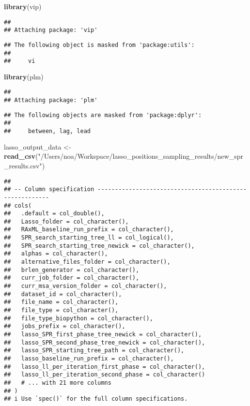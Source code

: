 \documentclass[
]{article}
\newenvironment{Shaded}{\begin{snugshade}}{\end{snugshade}}
\newcommand{\KeywordTok}[1]{\textcolor[rgb]{0.13,0.29,0.53}{\textbf{#1}}}
\newcommand{\NormalTok}[1]{#1}
\newcommand{\StringTok}[1]{\textcolor[rgb]{0.31,0.60,0.02}{#1}}
\begin{document}
\begin{Shaded}
\begin{Highlighting}[]
\KeywordTok{library}\NormalTok{(vip) }
\end{Highlighting}
\end{Shaded}

\begin{verbatim}
## 
## Attaching package: 'vip'
\end{verbatim}

\begin{verbatim}
## The following object is masked from 'package:utils':
## 
##     vi
\end{verbatim}

\begin{Shaded}
\begin{Highlighting}[]
\KeywordTok{library}\NormalTok{(plm)}
\end{Highlighting}
\end{Shaded}

\begin{verbatim}
## 
## Attaching package: 'plm'
\end{verbatim}

\begin{verbatim}
## The following objects are masked from 'package:dplyr':
## 
##     between, lag, lead
\end{verbatim}

\begin{Shaded}
\begin{Highlighting}[]
\NormalTok{lasso_output_data <-}\StringTok{ }\KeywordTok{read_csv}\NormalTok{(}\StringTok{"/Users/noa/Workspace/lasso_positions_sampling_results/new_spr_results.csv"}\NormalTok{)}
\end{Highlighting}
\end{Shaded}

\begin{verbatim}
## 
## -- Column specification --------------------------------------------------------
## cols(
##   .default = col_double(),
##   Lasso_folder = col_character(),
##   RAxML_baseline_run_prefix = col_character(),
##   SPR_search_starting_tree_ll = col_logical(),
##   SPR_search_starting_tree_newick = col_character(),
##   alphas = col_character(),
##   alternative_files_folder = col_character(),
##   brlen_generator = col_character(),
##   curr_job_folder = col_character(),
##   curr_msa_version_folder = col_character(),
##   dataset_id = col_character(),
##   file_name = col_character(),
##   file_type = col_character(),
##   file_type_biopython = col_character(),
##   jobs_prefix = col_character(),
##   lasso_SPR_first_phase_tree_newick = col_character(),
##   lasso_SPR_second_phase_tree_newick = col_character(),
##   lasso_SPR_starting_tree_path = col_character(),
##   lasso_baseline_run_prefix = col_character(),
##   lasso_ll_per_iteration_first_phase = col_character(),
##   lasso_ll_per_iteration_second_phase = col_character()
##   # ... with 21 more columns
## )
## i Use `spec()` for the full column specifications.
\end{verbatim}
\end{document}
